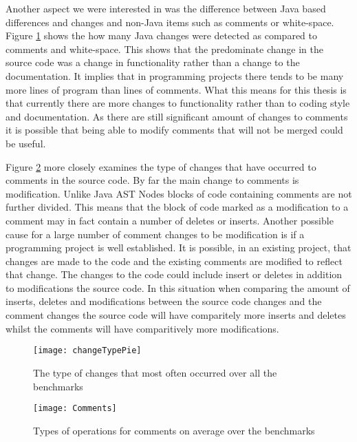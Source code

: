 Another aspect we were interested in was the difference between Java based differences and changes and non-Java items such as comments or white-space.
Figure \ref{fig:changeType} shows the how many Java changes were detected as compared to comments and white-space.
This shows that the predominate change in the source code was a change in functionality rather than a change to the documentation.
It implies that in programming projects there tends to be many more lines of program than lines of comments.
What this means for this thesis is that currently there are more changes to functionality rather than to coding style and documentation.
As there are still significant amount of changes to comments it is possible that being able to modify comments that will not be merged could be useful.  

Figure \ref{fig:commentsPie} more closely examines the type of changes that have occurred to comments in the source code.
By far the main change to comments is modification.
Unlike Java AST Nodes blocks of code containing comments are not further divided.
This means that the block of code marked as a modification to a comment may in fact contain a number of deletes or inserts.
Another possible cause for a large number of comment changes to be modification is if a programming project is well established.
It is possible, in an existing project, that changes are made to the code and the existing comments are modified to reflect that change.
The changes to the code could include insert or deletes in addition to modifications the source code.
In this situation when comparing the amount of inserts, deletes and modifications between the source code changes and the comment changes the source code will have comparitely more inserts and deletes whilst the comments will have comparitively more modifications.


\begin{figure}[p] 
 \begin{center}
 \texttt{[image: changeTypePie]}
 \end{center}
 \caption{The type of changes that most often occurred over all the benchmarks}
 \label{fig:changeType}
\end{figure}

\begin{figure}[p] 
 \begin{center}
 \texttt{[image: Comments]}
 \end{center}
 \caption{Types of operations for comments on average over the benchmarks}
 \label{fig:commentsPie}
\end{figure}

